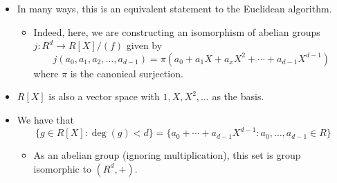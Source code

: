 \documentclass[../notes.tex]{subfiles}
\begin{document}
\begin{itemize}
\begin{proof}
        The existence of the first two maps is obvious (they are just instances of the canonical injection and surjection, respectively).\par\smallskip
        We now verify that the last two sets are in bijective correspondence. Define a map $\varphi$ between them via the canonical surjection (note that since the domain of $\varphi$ is not $R[X]$, we will still have to verify surjectivity here). As established previously, $\varphi$ is well defined.\par
        To prove that $\varphi$ is injective, it will suffice to show that $\ker\varphi=0$. Let $h$ be an arbitrary polynomial in $R[X]$ with $\deg(h)<d$. Suppose $\varphi(h)=\bar{0}=0+(f)=(f)$. Then $h\in(f)$. It follows that either $h=0$ or $\deg(h)\geq\deg(f)=d$. But as an element of the domain $\deg(h)<d$ by hypothesis. Therefore, $h=0$, as desired.\par
        To prove that $\varphi$ is surjective, it will suffice to show that for every $h+(f)\in R[X]/(f)$, there exists $r\in R[X]$ with $\deg(r)<d$ such that $\varphi(r)=h+(f)$. Let $h+(f)\in R[X]/(f)$ be arbitrary. By the Euclidean algorithm, $h=qf+r$ for some $q,r\in R[X]$ where $\deg(r)<\deg(f)=d$. Moreover, since $r=h+(-q)f$, $r\in h+(f)$ and hence $h+(f)=r+(f)$. Therefore, since $r$ is in the domain of $\varphi$ (as it has degree less than $d$), $\varphi(r)=r+(f)=h+(f)$, as desired.
    \end{proof}
    \item In many ways, this is an equivalent statement to the Euclidean algorithm.
    \begin{itemize}
        \item Indeed, here, we are constructing an isomorphism of abelian groups $j:R^d\to R[X]/(f)$ given by
        \begin{equation*}
            j(a_0,a_1,a_2,\dots,a_{d-1}) = \pi(a_0+a_1X+a_xX^2+\cdots+a_{d-1}X^{d-1})
        \end{equation*}
        where $\pi$ is the canonical surjection.
    \end{itemize}
    \item $R[X]$ is also a vector space with $1,X,X^2,\dots$ as the basis.
    \item We have that
    \begin{equation*}
        \{g\in R[X]:\deg(g)<d\} = \{a_0+\cdots+a_{d-1}X^{d-1}:a_0,\dots,a_{d-1}\in R\}
    \end{equation*}
    \begin{itemize}
        \item As an abelian group (ignoring multiplication), this set is group isomorphic to $(R^d,+)$.

\end{itemize}
\end{itemize}
\end{document}
